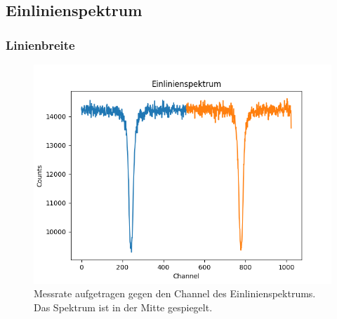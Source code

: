 \documentclass[12pt,a4paper]{article}
\begin{document}
\subsection{Einlinienspektrum}

\subsubsection{Linienbreite}
\begin{figure}
\centering
\includegraphics[scale=0.8]{Bilder/Einlinien/Ein_Rohdaten.png}
\caption{Messrate aufgetragen gegen den Channel des Einlinienspektrums. Das Spektrum ist in der Mitte gespiegelt.}
\label{fig:Ein_Roh}
\end{figure}
\end{document}

